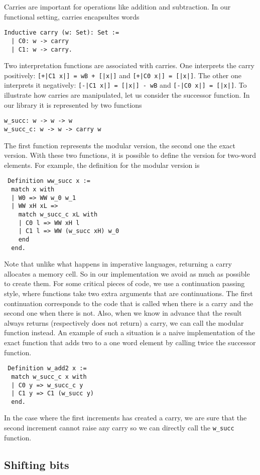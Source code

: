 Carries are important for operations like addition and subtraction.
In our functional setting, carries encapsultes words
\begin{verbatim}
Inductive carry (w: Set): Set :=
  | C0: w -> carry
  | C1: w -> carry.
\end{verbatim}
Two interpretation functions are associated with carries.
One interprets the carry positively: {\tt [+|C1 x|] = wB + [|x|]} and
{\tt [+|C0 x|] = [|x|]}. 
The other one interprets it negatively:
{\tt [-|C1 x|] = [|x|] - wB} and {\tt [-|C0 x|] = [|x|]}.
To illustrate how carries are manipulated, let us consider the successor function.
In our library it is represented by two functions
\begin{verbatim}
w_succ: w -> w -> w
w_succ_c: w -> w -> carry w
\end{verbatim}
The first function represents the modular version, the second one the exact 
version. With these two functions, it is possible to define the version
for two-word elements. For example, the definition for the modular version is
\begin{verbatim}
 Definition ww_succ x :=
  match x with
  | W0 => WW w_0 w_1
  | WW xH xL =>
    match w_succ_c xL with
    | C0 l => WW xH l
    | C1 l => WW (w_succ xH) w_0
    end
  end.
\end{verbatim}
Note that unlike what happens in imperative languages, returning
a carry allocates a memory cell. So in our implementation
we avoid as much as possible to create them.
For some critical pieces of code, we use a continuation passing style,
where functions take two extra arguments that are continuations.
The first continuation corresponds to the code that is called when there is a carry and
the second one when there is not. Also, when we know in advance that the result always 
returns (respectively does not return) a carry, we can call the modular function instead. 
An example of such a situation is a naive implementation of the exact function that adds two to a one
word element by calling twice the successor function.
\begin{verbatim}
 Definition w_add2 x :=
  match w_succ_c x with
  | C0 y => w_succ_c y
  | C1 y => C1 (w_succ y)
  end.
\end{verbatim}
In the case where the first increments has created a carry, we are sure that the second
increment cannot raise any carry so we can directly call the {\tt w\_succ} function.

\subsection{Shifting bits}

